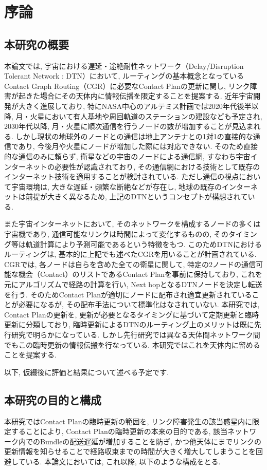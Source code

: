 \chapter{序論}

\section{本研究の概要}
本論文では, 宇宙における遅延・途絶耐性ネットワーク（Delay/Disruption Tolerant Network : DTN）において, 
ルーティングの基本概念となっているContact Graph Routing（CGR）に必要なContact Planの更新に関し, 
リンク障害が起きた場合にその天体内に情報伝播を限定することを提案する. 
近年宇宙開発が大きく進展しており, 特にNASA中心のアルテミス計画では2020年代後半以降, 
月・火星において有人基地や周回軌道のステーションの建設なども予定され, 
2030年代以降, 月・火星に順次通信を行うノードの数が増加することが見込まれる. 
しかし現状の地球外のノードとの通信は地上アンテナとの1対1の直接的な通信であり, 
今後月や火星にノードが増加した際には対応できない. そのため直接的な通信のみに頼らず, 
衛星などの宇宙のノードによる通信網, すなわち宇宙インターネットの必要性が認識されており, 
その通信網における技術として既存のインターネット技術を適用することが検討されている. 
ただし通信の視点において宇宙環境は, 大きな遅延・頻繁な断絶などが存在し, 
地球の既存のインターネットは前提が大きく異なるため, 
上記のDTNというコンセプトが構想されている. 

また宇宙インターネットにおいて, そのネットワークを構成するノードの多くは宇宙機であり, 
通信可能なリンクは時間によって変化するものの, そのタイミング等は軌道計算により予測可能であるという特徴をもつ. 
このためDTNにおけるルーティングは, 基本的に上記でも述べたCGRを用いることが計画されている. 
CGRでは, 各ノードは自らを含めた全ての衛星に関して, 
特定の2ノードの通信可能な機会（Contact）のリストであるContact Planを事前に保持しており, 
これを元にアルゴリズムで経路の計算を行い, Next hopとなるDTNノードを決定し転送を行う. 
そのためContact Planが適切にノードに配布され適宜更新されていることが必要になるが, 
その配布手法について標準化はなされていない. 本研究では, Contact Planの更新を, 
更新が必要となるタイミングに基づいて定期更新と臨時更新に分類しており, 
臨時更新によるDTNのルーティング上のメリットは既に先行研究で明らかになっている. 
しかし先行研究では異なる天体間ネットワーク間でもこの臨時更新の情報伝搬を行なっている. 
本研究ではこれを天体内に留めることを提案する. 

以下, 仮綴後に評価と結果について述べる予定です. 
\section{本研究の目的と構成}
本研究ではContact Planの臨時更新の範囲を, リンク障害発生の該当惑星内に限定することにより, 
Contact Planの臨時更新の本来の目的である, 該当ネットワーク内でのBundleの配送遅延が増加することを防ぎ, 
かつ他天体にまでリンクの更新情報を知らせることで経路収束までの時間が大きく増大してしまうことを回避している. 
本論文においては, これ以降, 以下のような構成をとる. 

